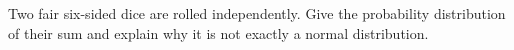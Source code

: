 Two fair six-sided dice are rolled independently. Give the probability distribution of their sum and explain why it is not exactly a normal distribution.
